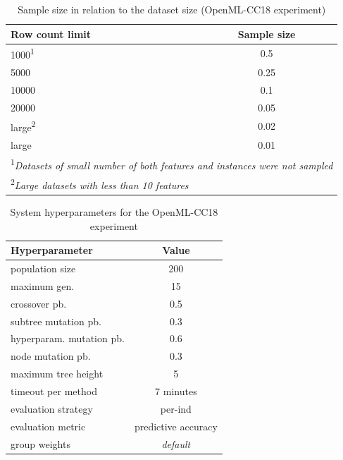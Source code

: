 \begin{table}[b]

\centering
\caption{Sample size in relation to the dataset size (OpenML-CC18 experiment)}\label{tab04:exp3:size}
\begin{tabular}{l c}
\toprule
\textbf{Row count limit} & \textbf{Sample size} \\
\midrule
1000\textsuperscript{1} & 0.5 \\
5000 & 0.25 \\
10000 & 0.1 \\
20000 & 0.05 \\
large\textsuperscript{2} & 0.02 \\
large & 0.01 \\
\bottomrule

\multicolumn{2}{l}{\footnotesize
\textsuperscript{1}\textit{Datasets of small number of both features and
instances were not sampled}} \\
\multicolumn{2}{l}{\footnotesize
\textsuperscript{2}\textit{Large datasets with less than 10 features}} 

\end{tabular}

\end{table}

\begin{table}[t]

\centering
\caption{System hyperparameters for the OpenML-CC18 experiment}\label{tab04:exp3:setting}
\begin{tabular}{l c}
\toprule
\textbf{\upshape Hyperparameter} & \textbf{Value} \\
\midrule
population size & 200 \\
maximum gen. & 15 \\
crossover pb. & 0.5 \\
subtree mutation pb. & 0.3 \\
hyperparam. mutation pb. & 0.6 \\
node mutation pb. & 0.3 \\
maximum tree height & 5 \\
timeout per method  & 7 minutes \\
evaluation strategy & per-ind \\
evaluation metric & predictive accuracy \\
group weights & \textit{default} \\
\bottomrule

\end{tabular}

\end{table}

